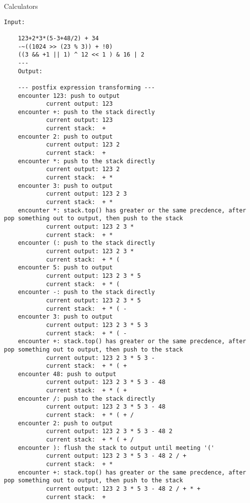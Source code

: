 \pagebreak

\begin{homeworkProblem}{Calculators}

    \begin{lstlisting}[breaklines=true]
    Input:

    123+2*3*(5-3+48/2) + 34
    -~((1024 >> (23 % 3)) + !0)
    ((3 && +1 || 1) ^ 12 << 1 ) & 16 | 2
    ---
    Output:

    --- postfix expression transforming ---
    encounter 123: push to output
            current output: 123
    encounter +: push to the stack directly
            current output: 123
            current stack:  +
    encounter 2: push to output
            current output: 123 2
            current stack:  +
    encounter *: push to the stack directly
            current output: 123 2
            current stack:  + *
    encounter 3: push to output
            current output: 123 2 3
            current stack:  + *
    encounter *: stack.top() has greater or the same precdence, after pop something out to output, then push to the stack
            current output: 123 2 3 *
            current stack:  + *
    encounter (: push to the stack directly
            current output: 123 2 3 *
            current stack:  + * (
    encounter 5: push to output
            current output: 123 2 3 * 5
            current stack:  + * (
    encounter -: push to the stack directly
            current output: 123 2 3 * 5
            current stack:  + * ( -
    encounter 3: push to output
            current output: 123 2 3 * 5 3
            current stack:  + * ( -
    encounter +: stack.top() has greater or the same precdence, after pop something out to output, then push to the stack
            current output: 123 2 3 * 5 3 -
            current stack:  + * ( +
    encounter 48: push to output
            current output: 123 2 3 * 5 3 - 48
            current stack:  + * ( +
    encounter /: push to the stack directly
            current output: 123 2 3 * 5 3 - 48
            current stack:  + * ( + /
    encounter 2: push to output
            current output: 123 2 3 * 5 3 - 48 2
            current stack:  + * ( + /
    encounter ): flush the stack to output until meeting '('
            current output: 123 2 3 * 5 3 - 48 2 / +
            current stack:  + *
    encounter +: stack.top() has greater or the same precdence, after pop something out to output, then push to the stack
            current output: 123 2 3 * 5 3 - 48 2 / + * +
            current stack:  +

\end{lstlisting}
\end{homeworkProblem}
